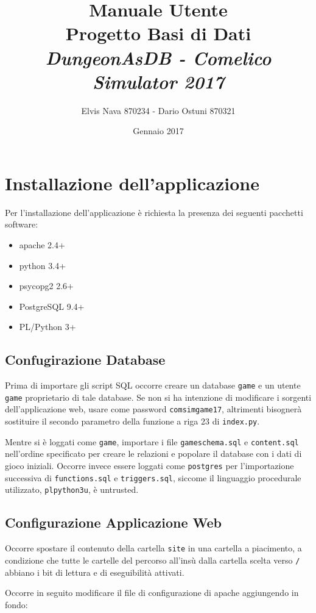 \documentclass[10pt,a4paper]{article}
\author{Elvis Nava 870234 - Dario Ostuni 870321}
\title{Manuale Utente\\
 Progetto Basi di Dati\\
\textit{DungeonAsDB - Comelico Simulator 2017}}
\date{Gennaio 2017}
\begin{document}
\maketitle

\section{Installazione dell'applicazione}
Per l'installazione dell'applicazione è richiesta la presenza dei seguenti pacchetti software:
\begin{itemize}
\item apache 2.4+
\item python 3.4+
\item psycopg2 2.6+
\item PostgreSQL 9.4+
\item PL/Python 3+
\end{itemize}

\subsection{Confugirazione Database}
Prima di importare gli script SQL occorre creare un database \texttt{game} e un utente \texttt{game} proprietario di tale database. Se non si ha intenzione di modificare i sorgenti dell'applicazione web, usare come password \texttt{comsimgame17}, altrimenti bisognerà sostituire il secondo parametro della funzione a riga 23 di \texttt{index.py}.

Mentre si è loggati come \texttt{game}, importare i file \texttt{gameschema.sql} e \texttt{content.sql} nell'ordine specificato per creare le relazioni e popolare il database con i dati di gioco iniziali. Occorre invece essere loggati come \texttt{postgres} per l'importazione successiva di \texttt{functions.sql} e \texttt{triggers.sql}, siccome il linguaggio procedurale utilizzato, \texttt{plpython3u}, è untrusted.

\subsection{Configurazione Applicazione Web}
Occorre spostare il contenuto della cartella \texttt{site} in una cartella a piacimento, a condizione che tutte le cartelle del percorso all'insù dalla cartella scelta verso \texttt{/} abbiano i bit di lettura e di eseguibilità attivati.

Occorre in seguito modificare il file di configurazione di apache aggiungendo in fondo:
\end{document}
